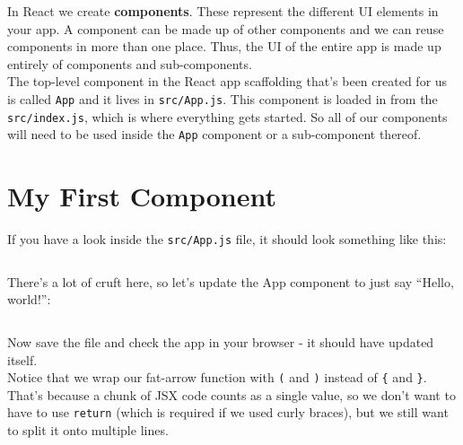 In React we create \textbf{components}. These represent the different UI elements in your app. A component can be made up of other components and we can reuse components in more than one place. Thus, the UI of the entire app is made up entirely of components and sub-components.
\\

The top-level component in the React app scaffolding that's been created for us is called \texttt{App} and it lives in \texttt{src/App.js}. This component is loaded in from the \texttt{src/index.js}, which is where everything gets started. So all of our components will need to be used inside the \texttt{App} component or a sub-component thereof.


\pagebreak


\section{My First Component}

If you have a look inside the \texttt{src/App.js} file, it should look something like this:

\inputminted{jsx}{02-jsx/figures/01-App.jsx}

There's a lot of cruft here, so let's update the App component to just say ``Hello, world!'':

\inputminted{jsx}{02-jsx/figures/02-App-redux.jsx}

Now save the file and check the app in your browser - it should have updated itself.
\\

Notice that we wrap our fat-arrow function with \texttt{(} and \texttt{)} instead of \texttt{\{} and \texttt{\}}. That's because a chunk of JSX code counts as a single value, so we don't want to have to use \texttt{return} (which is required if we used curly braces), but we still want to split it onto multiple lines.
\\

